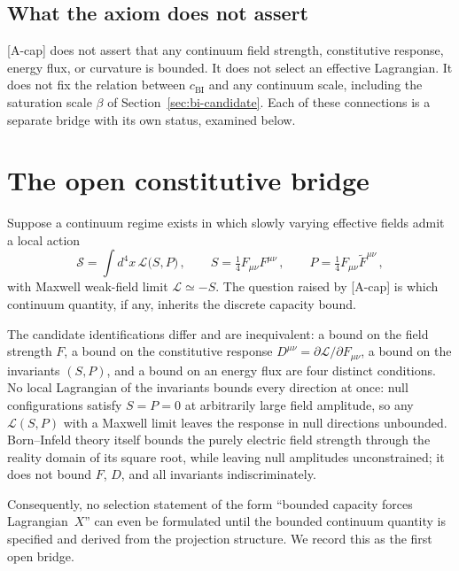 \documentclass[epj]{svjour}
\begin{document}
    \subsection{What the axiom does not assert}
      \label{subsec:non-assertions}

      [A-cap] does not assert that any continuum field strength, constitutive response, energy flux,
      or curvature is bounded.
      It does not select an effective Lagrangian.
      It does not fix the relation between $c_{\mathrm{BI}}$ and any continuum scale, including the
      saturation scale $\beta$ of Section~\ref{sec:bi-candidate}.
      Each of these connections is a separate bridge with its own status, examined below.

  \section{The open constitutive bridge}
    \label{sec:constitutive-bridge}

    Suppose a continuum regime exists in which slowly varying effective fields admit a local action
    \begin{equation}
      \mathcal{S} = \int d^4x\,\mathcal{L}\bigl(S, P\bigr)\,,
      \qquad
      S = \tfrac14 F_{\mu\nu}F^{\mu\nu}\,,
      \qquad
      P = \tfrac14 F_{\mu\nu}\tilde F^{\mu\nu}\,,
      \label{eq:local-action}
    \end{equation}
    with Maxwell weak-field limit $\mathcal{L} \simeq -S$.
    The question raised by [A-cap] is which continuum quantity, if any, inherits the discrete
    capacity bound.

    The candidate identifications differ and are inequivalent:
    a bound on the field strength $F$, a bound on the constitutive response
    $D^{\mu\nu} = \partial\mathcal{L}/\partial F_{\mu\nu}$, a bound on the invariants $(S, P)$, and a
    bound on an energy flux are four distinct conditions.
    No local Lagrangian of the invariants bounds every direction at once:
    null configurations satisfy $S = P = 0$ at arbitrarily large field amplitude, so any
    $\mathcal{L}(S, P)$ with a Maxwell limit leaves the response in null directions unbounded.
    Born--Infeld theory itself bounds the purely electric field strength through the reality domain
    of its square root, while leaving null amplitudes unconstrained; it does not bound $F$, $D$, and
    all invariants indiscriminately.

    Consequently, no selection statement of the form ``bounded capacity forces Lagrangian~$X$'' can
    even be formulated until the bounded continuum quantity is specified and derived from the
    projection structure.
    We record this as the first open bridge.
\end{document}
